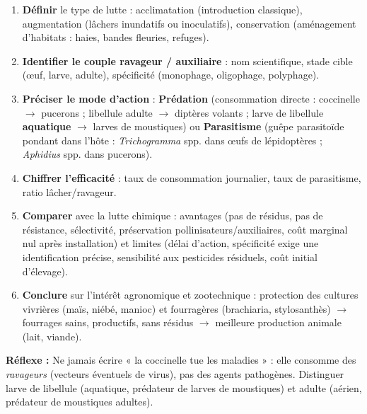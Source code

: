 \documentclass[11pt]{article}
\begin{document}
\begin{methode}
\begin{enumerate}
\item \textbf{Définir} le type de lutte : acclimatation (introduction classique), augmentation (lâchers inundatifs ou inoculatifs), conservation (aménagement d'habitats : haies, bandes fleuries, refuges).
\item \textbf{Identifier le couple ravageur / auxiliaire} : nom scientifique, stade cible (œuf, larve, adulte), spécificité (monophage, oligophage, polyphage).
\item \textbf{Préciser le mode d'action} : \textbf{Prédation} (consommation directe : coccinelle $\rightarrow$ pucerons ; libellule adulte $\rightarrow$ diptères volants ; larve de libellule \textbf{aquatique} $\rightarrow$ larves de moustiques) ou \textbf{Parasitisme} (guêpe parasitoïde pondant dans l'hôte : \emph{Trichogramma} spp. dans œufs de lépidoptères ; \emph{Aphidius} spp. dans pucerons).
\item \textbf{Chiffrer l'efficacité} : taux de consommation journalier, taux de parasitisme, ratio lâcher/ravageur.
\item \textbf{Comparer} avec la lutte chimique : avantages (pas de résidus, pas de résistance, sélectivité, préservation pollinisateurs/auxiliaires, coût marginal nul après installation) et limites (délai d'action, spécificité exige une identification précise, sensibilité aux pesticides résiduels, coût initial d'élevage).
\item \textbf{Conclure} sur l'intérêt agronomique et zootechnique : protection des cultures vivrières (maïs, niébé, manioc) et fourragères (brachiaria, stylosanthès) $\rightarrow$ fourrages sains, productifs, sans résidus $\rightarrow$ meilleure production animale (lait, viande).
\end{enumerate}
\textbf{Réflexe :} Ne jamais écrire « la coccinelle tue les maladies » : elle consomme des \emph{ravageurs} (vecteurs éventuels de virus), pas des agents pathogènes. Distinguer larve de libellule (aquatique, prédateur de larves de moustiques) et adulte (aérien, prédateur de moustiques adultes).
\end{methode}
\end{document}
